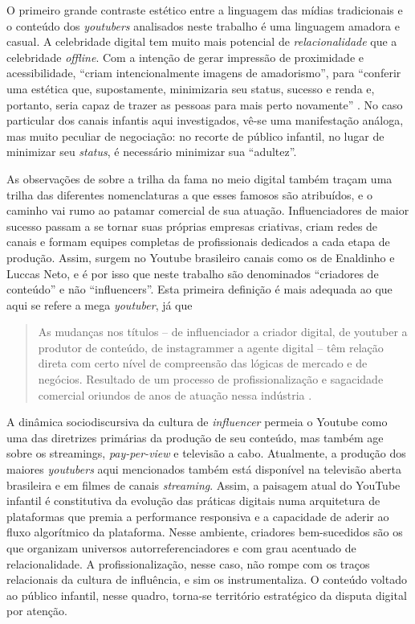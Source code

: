 \documentclass[portuguese]{textolivre}
\begin{document}
O primeiro grande contraste estético entre a linguagem das mídias tradicionais e o conteúdo dos \textit{youtubers} analisados neste trabalho é uma linguagem amadora e casual. A celebridade digital tem muito mais potencial de \textit{relacionalidade} que a celebridade \textit{offline}. Com a intenção de gerar impressão de proximidade e acessibilidade, “criam intencionalmente imagens de amadorismo”, para “conferir uma estética que, supostamente, minimizaria seu status, sucesso e renda e, portanto, seria capaz de trazer as pessoas para mais perto novamente” \cite[p. 294]{Abidin2021Influencers}. No caso particular dos canais infantis aqui investigados, vê-se uma manifestação análoga, mas muito peculiar de negociação: no recorte de público infantil, no lugar de minimizar seu \textit{status}, é necessário minimizar sua “adultez”.

As observações de \textcite{Abidin2021Influencers} sobre a trilha da fama no meio digital também traçam uma trilha das diferentes nomenclaturas a que esses famosos são atribuídos, e o caminho vai rumo ao patamar comercial de sua atuação. Influenciadores de maior sucesso passam a se tornar suas próprias empresas criativas, criam redes de canais e formam equipes completas de profissionais dedicados a cada etapa de produção. Assim, surgem no Youtube brasileiro canais como os de Enaldinho e Luccas Neto, e é por isso que neste trabalho são denominados “criadores de conteúdo” e não “influencers”. Esta primeira definição é mais adequada ao que aqui se refere a mega \textit{youtuber}, já que

\begin{quote}
    As mudanças nos títulos – de influenciador a criador digital, de youtuber a produtor de conteúdo, de instagrammer a agente digital – têm relação direta com certo nível de compreensão das lógicas de mercado e de negócios. Resultado de um processo de profissionalização e sagacidade comercial oriundos de anos de atuação nessa indústria \cite[p. 300]{Abidin2021Influencers}.
\end{quote}

A dinâmica sociodiscursiva da cultura de \textit{influencer} permeia o Youtube como uma das diretrizes primárias da produção de seu conteúdo, mas também age sobre os streamings, \textit{pay-per-view} e televisão a cabo. Atualmente, a produção dos maiores \textit{youtubers} aqui mencionados também está disponível na televisão aberta brasileira e em filmes de canais \textit{streaming}. Assim, a paisagem atual do YouTube infantil é constitutiva da evolução das práticas digitais numa arquitetura de plataformas que premia a performance responsiva e a capacidade de aderir ao fluxo algorítmico da plataforma. Nesse ambiente, criadores bem-sucedidos são os que organizam universos autorreferenciadores e com grau acentuado de relacionalidade. A profissionalização, nesse caso, não rompe com os traços relacionais da cultura de influência, e sim os instrumentaliza. O conteúdo voltado ao público infantil, nesse quadro, torna-se território estratégico da disputa digital por atenção.
\end{document}
